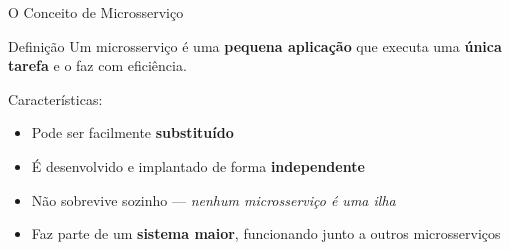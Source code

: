 \documentclass[aspectratio=169]{beamer}
\begin{document}
\begin{frame}{O Conceito de Microsserviço}
    \begin{block}{Definição}
        Um microsserviço é uma \textbf{pequena aplicação} que executa uma \textbf{única tarefa} e o faz com eficiência.
    \end{block}
    \vspace{0.3cm}
    Características:
    \begin{itemize}
        \item Pode ser facilmente \textbf{substituído}
        \item É desenvolvido e implantado de forma \textbf{independente}
        \item Não sobrevive sozinho --- \textit{nenhum microsserviço é uma ilha}
        \item Faz parte de um \textbf{sistema maior}, funcionando junto a outros microsserviços
    \end{itemize}
\end{frame}
\end{document}
